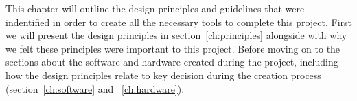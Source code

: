 	This chapter will outline the design principles and guidelines that were indentified in order to create all the necessary tools to complete this project. 
	First we will present the design principles in section~\ref{ch:principles} alongside with why we felt these principles were important to this project.
	Before moving on to the sections about the software and hardware created during the project, including how the design principles relate to key decision during the creation process (section~\ref{ch:software} and ~\ref{ch:hardware}).
	
%


